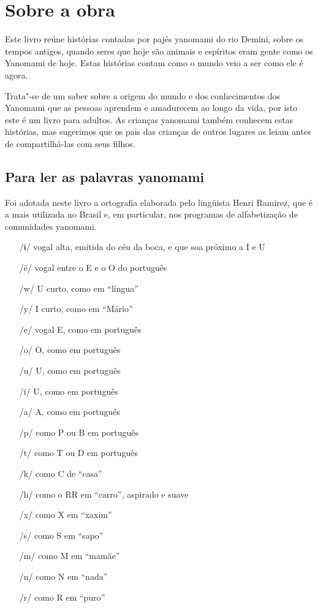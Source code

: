 \section{Sobre a obra}

Este livro reúne histórias contadas por pajés yanomami do rio Demini, sobre os tempos antigos, quando seres que hoje são animais e espíritos eram gente como os Yanomami de hoje. Estas histórias contam como o mundo veio a ser como ele é agora. 

Trata"-se de um saber sobre a origem do mundo e dos conhecimentos dos Yanomami que as pessoas aprendem e amadurecem ao longo da vida, por isto este é um livro para adultos. As crianças yanomami também conhecem estas histórias, mas sugerimos que os pais das crianças de outros lugares as leiam antes de compartilhá-las com seus filhos.

\subsection{Para ler as palavras yanomami}


Foi adotada neste livro a ortografia elaborada pelo lingüista Henri Ramirez, que é a mais utilizada no Brasil e, em particular, nos programas de alfabetização de comunidades yanomami. 

\begin{itemize}
\item[/ɨ/] vogal alta, emitida do céu da boca, e que soa próximo a I e U
\item[/ë/] vogal entre o E e o O do português
\item[/w/] U curto, como em “língua”
\item[/y/] I curto, como em “Mário”
\item[/e/] vogal E, como em português
\item[/o/] O, como em português
\item[/u/] U, como em português
\item[/i/] U, como em português
\item[/a/] A, como em português
\item[/p/] como P ou B em português
\item[/t/] como T ou D em português
\item[/k/] como C de “casa”
\item[/h/] como o RR em “carro”, aspirado e suave
\item[/x/] como X em “xaxim”
\item[/s/] como S em “sapo”
\item[/m/] como M em “mamãe”
\item[/n/] como N em “nada”
\item[/r/] como R em “puro”
\end{itemize}

